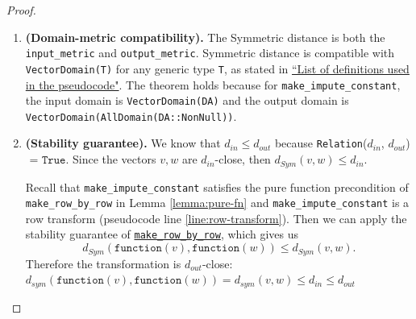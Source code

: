 \documentclass[11pt,a4paper]{article}
\newcommand{\grace}[1]{{ {\color{purple}{(grace)~#1}}}}
\begin{document}
\begin{proof}
\begin{enumerate}
\grace{I didn't use the fact that v is of type DA::Carrier; am I doing something wrong?}

\item \textbf{(Domain-metric compatibility).} The Symmetric distance is both the \texttt{input\_metric} and \texttt{output\_metric}. Symmetric distance is compatible with \texttt{VectorDomain(T)} for any generic type \texttt{T}, as stated in \href{https://www.overleaf.com/project/60d215bf90b337ac02200a99}{``List of definitions used in the pseudocode"}. The theorem holds because for \texttt{make\_impute\_constant}, the input domain is \texttt{VectorDomain(DA)} and the output domain is \texttt{VectorDomain(AllDomain(DA::NonNull))}. 

\item \textbf{(Stability guarantee).}     We know that $d_{in} \leq d_{out}$ because \texttt{Relation}($d_{in}$, $d_{out}$) $\texttt{ = True}$. Since the vectors $v, w$ are $d_{in}$-close, then $d_{Sym}(v, w) \leq d_{in}$.

Recall that \texttt{make\_impute\_constant} satisfies the pure function precondition of \texttt{make\_row\_by\_row} in Lemma \ref{lemma:pure-fn} and \texttt{make\_impute\_constant} is a row transform (pseudocode line \ref{line:row-transform}). Then we can apply the stability guarantee of \href{https://www.overleaf.com/2489843918kjvyyytkjfsg}{\texttt{make\_row\_by\_row}}, which gives us $$d_{Sym}(\texttt{function}(v), \texttt{function}(w)) \leq d_{Sym}(v, w).$$ Therefore the transformation is $d_{out}$-close: $d_{sym}(\texttt{function}(v), \texttt{function}(w)) = d_{sym}(v, w) \leq d_{in} \leq d_{out}$

\end{enumerate}
\end{proof}
\end{document}
